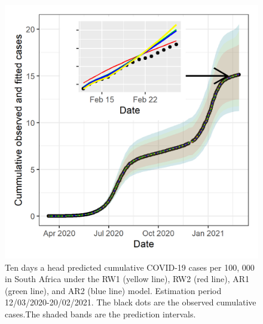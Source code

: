 \documentclass[10pt,letterpaper]{article}
\begin{document}
\begin{figure}[h]
\includegraphics[width=0.99\linewidth]{forcast_cum_all.png} \caption{Ten days a head predicted cumulative COVID-19 cases per 100, 000 in South Africa under the RW1 (yellow line), RW2 (red line), AR1 (green line), and AR2 (blue line) model. Estimation period 12/03/2020-20/02/2021. The black dots are the observed cumulative cases.The shaded bands are the prediction intervals. }\label{fig:predd}
\end{figure}
\end{document}
